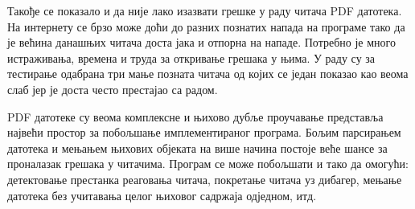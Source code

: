 \documentclass[12pt,oneside]{memoir}
\begin{document}
Такође се показало и да није лако изазвати грешке у раду читача PDF датотека. На интернету се брзо може доћи до разних познатих напада на програме тако да је већина данашњих читача доста јака и отпорна на нападе. Потребно је много истраживања, времена и труда за откривање грешака у њима. У раду су за тестирање одабрана три мање позната читача од којих се један показао као веома слаб јер је доста често престајао са радом. 

PDF датотеке су веома комплексне и њихово дубље проучавање представља највећи простор за побољшање имплементираног програма. Бољим парсирањем датотека и мењањем њихових објеката на више начина постоје веће шансе за проналазак грешака у читачима. Програм се може побољшати и тако да омогући: детектовање престанка реаговања читача, покретање читача уз дибагер, мењање датотека без учитавања целог њиховог садржаја одједном, итд. 


\literatura

\backmatter

\end{document}
